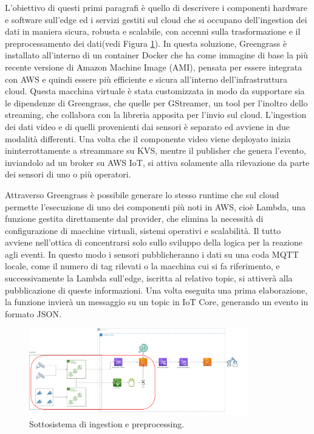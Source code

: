 L'obiettivo di questi primi paragrafi è quello di descrivere i componenti hardware e software sull’edge ed i servizi gestiti sul cloud che si occupano dell’ingestion dei dati in maniera sicura, robusta e scalabile, con accenni sulla trasformazione e il preprocessamento dei dati(vedi Figura \ref{fig:sub-ing}). In questa soluzione, Greengrass è installato all’interno di un container Docker che ha come immagine di base la più recente versione di Amazon Machine Image (AMI), pensata per essere integrata con AWS e quindi essere più efficiente e sicura all’interno dell’infrastruttura cloud. Questa macchina virtuale è stata customizzata in modo da supportare sia le dipendenze di Greengrass, che quelle per GStreamer, un tool per l’inoltro dello streaming, che collabora con la libreria apposita per l'invio sul cloud. L’ingestion dei dati video e di quelli provenienti dai sensori è separato ed avviene in due modalità differenti. Una volta che il componente video viene deployato inizia ininterrottamente a streammare su KVS, mentre il publisher che genera l’evento, inviandolo ad un broker su AWS IoT, si attiva solamente alla rilevazione da parte dei sensori di uno o più operatori. 

Attraverso Greengrass è possibile generare lo stesso runtime che sul cloud permette l’esecuzione di uno dei componenti più noti in AWS, cioè Lambda, una funzione gestita direttamente dal provider, che elimina la necessità di configurazione di macchine virtuali, sistemi operativi e scalabilità. Il tutto avviene nell’ottica di concentrarsi solo sullo sviluppo della logica per la reazione agli eventi. In questo modo i sensori pubblicheranno i dati su una coda MQTT locale, come il numero di tag rilevati o la macchina cui si fa riferimento, e successivamente la Lambda sull'edge, iscritta al relativo topic, si attiverà alla pubblicazione di queste informazioni. Una volta eseguita una prima elaborazione, la funzione invierà un messaggio su un topic in IoT Core, generando un evento in formato JSON. 

\begin{figure}[htbp]
    \centering
    \includegraphics[width=0.85\textwidth]{figures/sottosistema-ingestion.png}
    \caption{Sottosistema di ingestion e preprocessing.} 
    \label{fig:sub-ing}
\end{figure}

